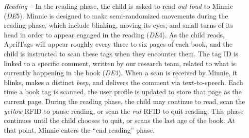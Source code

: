 \documentclass{sigchi}
\begin{document}

\textit{Reading --} In the reading phase, the child is asked to read \textit{out loud} to Minnie (\textit{DE}5). Minnie is designed to make semi-randomized movements during the reading phase, which include blinking, moving its eyes, and small turns of its head in order to appear engaged in the reading (\textit{DE}4). As the child reads, AprilTags will appear roughly every three to six pages of each book, and the child is instructed to scan these tags when they encounter them. The tag ID is linked to a specific comment, written by our research team, related to what is currently happening in the book (\textit{DE}4). When a scan is received by Minnie, it blinks, makes a distinct \textit{beep}, and delivers the comment via text-to-speech. Each time a book tag is scanned, the user profile is updated to store that page as the current page. During the reading phase, the child may continue to read, scan the \textit{yellow} RFID to pause reading, or scan the \textit{red} RFID to quit reading. This phase continues until the child chooses to quit, or scans the last age of the book. At that point, Minnie enters the ``end reading'' phase.
\end{document}
